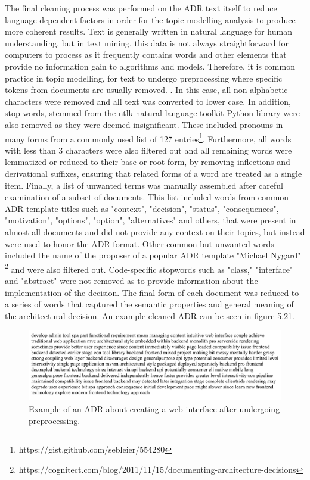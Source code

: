         The final cleaning process was performed on the ADR text itself to reduce language-dependent factors in order for the topic modelling analysis to produce more coherent results. Text is generally written in natural language for human understanding, but in text mining, this data is not always straightforward for computers to process as it frequently contains words and other elements that provide no information gain to algorithms and models. Therefore, it is common practice in topic modelling, for text to undergo preprocessing where specific tokens from documents are usually removed. \cite{topic-modelling-text-cleaning, text-mining-lda}. In this case, all non-alphabetic characters were removed and all text was converted to lower case. In addition, stop words, stemmed from the ntlk natural language toolkit Python library were also removed as they were deemed insignificant. These included pronouns in many forms from a commonly used list of 127 entries\footnote{https://gist.github.com/sebleier/554280}. Furthermore, all words with less than 3 characters were also filtered out and all remaining words were lemmatized or reduced to their base or root form, by removing inflections and derivational suffixes, ensuring that related forms of a word are treated as a single item. Finally, a list of unwanted terms was manually assembled after careful examination of a subset of documents. This list included words from common ADR template titles such as "context", "decision", "status", "consequences", "motivation", "options", "option", "alternatives" and others, that were present in almost all documents and did not provide any context on their topics, but instead were used to honor the ADR format. Other common but unwanted words included the name of the proposer of a popular ADR template "Michael Nygard" \footnote{https://cognitect.com/blog/2011/11/15/documenting-architecture-decisions} and were also filtered out. Code-specific stopwords such as "class," "interface" and "abstract" were not removed as to provide information about the implementation of the decision. The final form of each document was reduced to a series of words that captured the semantic properties and general meaning of the architectural decision. An example cleaned ADR can be seen in figure 5.2\ref{fig:Cleaned_ADR}.
        
        \begin{figure}[]
            \centering
            \includegraphics[scale=0.6]{figures/adr_cleaned_example.jpeg}
            \caption{Example of an ADR about creating a web interface after undergoing preprocessing.}
            \label{fig:Cleaned_ADR}
        \end{figure}
        
